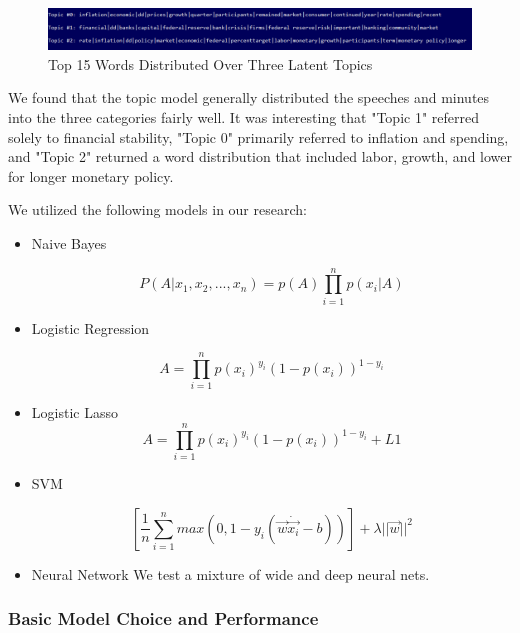 \documentclass[11pt]{article}
\newcommand{\vertSpace}[1]{\vspace{3mm}}
\begin{document}
\begin{figure}[h!]
  \includegraphics[width=\linewidth]{../output/data_for_graphs/Topic-Model-3-topics.PNG}
  \caption{Top 15 Words Distributed Over Three Latent Topics}
  \label{fig:LDA}
\end{figure}

We found that the topic model generally distributed the speeches and minutes into the three categories fairly well.  It was interesting that "Topic 1" referred solely to financial stability, "Topic 0" primarily referred to inflation and spending, and "Topic 2" returned a word distribution that included labor, growth, and lower for longer monetary policy. \vertSpace

\subsubsection{Supervised Models}

We utilized the following models in our research: 

  \begin{itemize}

    \item Naive Bayes

      $$P(A|x_1,x_2,...,x_n) = p(A)\prod_{i=1}^n p(x_i|A)$$

    \item Logistic Regression

     $$A = \prod_{i=1}^n p(x_i)^{y_i}(1-p(x_i))^{1-y_i}$$

    \item Logistic Lasso
     $$A = \prod_{i=1}^n p(x_i)^{y_i}(1-p(x_i))^{1-y_i}+ L1$$
    \item SVM

     $$\left [\frac{1}{n} \sum_{i=1}^n max(0,1 - y_i(\vec{w} \dot \vec{x_i} - b)) \right] + \lambda ||\vec{w}||^2$$
    \item Neural Network
      We test a mixture of wide and deep neural nets. 
  \end{itemize}



\subsubsection{Basic Model Choice and Performance} 
\end{document}
